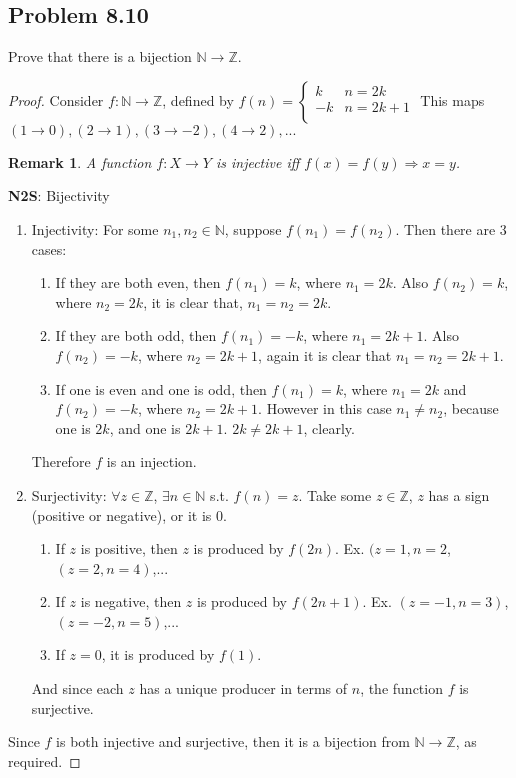 \documentclass[12pt]{article}
\newtheorem*{remark}{Remark}
\newcommand{\N}{\mathbb{N}}
\newcommand{\Z}{\mathbb{Z}}
\begin{document}
\subsection{Problem 8.10}
Prove that there is a bijection $\N\to\Z$.
\begin{proof}
Consider $f:\N\to\Z$, defined by $f(n)=
\left\{
\begin{array}{ll}
      k & n=2k\\
      -k & n=2k+1\\
\end{array}\right.$
\newline This maps $(1\to0),(2\to1),(3\to-2),(4\to2),...$
\begin{remark}
A function $f:X\to Y$ is injective iff $f(x)=f(y)\Longrightarrow x=y$.
\end{remark}
\textbf{N2S}: Bijectivity \begin{enumerate}
    \item Injectivity: For some $n_1,n_2\in\N$, suppose $f(n_1)=f(n_2)$. Then there are 3 cases:
    \begin{enumerate}
        \item If they are both even, then $f(n_1)=k$, where $n_1=2k$. Also $f(n_2)=k$, where $n_2=2k$, it is clear that, $n_1=n_2=2k$.
        \item If they are both odd, then $f(n_1)=-k$, where $n_1=2k+1$. Also $f(n_2)=-k$, where $n_2=2k+1$, again it is clear that $n_1=n_2=2k+1$.
        \item If one is even and one is odd, then $f(n_1)=k$, where $n_1=2k$ and $f(n_2)=-k$, where $n_2=2k+1$. However in this case $n_1\neq n_2$, because one is $2k$, and one is $2k+1$. $2k\neq2k+1$, clearly. \scalebox{1.5}{\Lightning}
    \end{enumerate}
Therefore $f$ is an injection.
    \item Surjectivity: $\forall z\in\Z$, $\exists n\in\N$ s.t. $f(n)=z$. Take some $z\in\Z$, $z$ has a sign (positive or negative), or it is 0. \begin{enumerate}
        \item If $z$ is positive, then $z$ is produced by $f(2n)$. Ex. $(z=1,n=2$, $(z=2,n=4)$,...
        \item If $z$ is negative, then $z$ is produced by $f(2n+1)$. Ex. $(z=-1,n=3)$, $(z=-2,n=5)$,...
        \item If $z=0$, it is produced by $f(1)$.
    \end{enumerate}
    And since each $z$ has a unique producer in terms of $n$, the function $f$ is surjective.
\end{enumerate}
Since $f$ is both injective and surjective, then it is a bijection from $\N\to\Z$, as required.
\end{proof}
\end{document}
